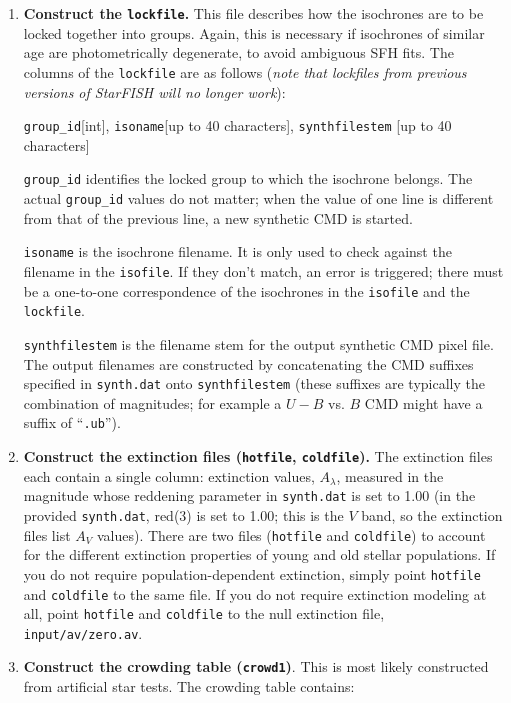 \documentclass[12pt]{book}
\def\ttg{\tt\color{DarkGreen}}
\def\tto{\tt\color{myOrange}}
\def\itr{\it\color{myRed}}
\begin{document}
\begin{enumerate}
\item {\bf Construct the {\tto lockfile}.}  This file describes how the 
isochrones are to be locked together into groups.  Again, this is 
necessary if isochrones of similar age are photometrically degenerate, 
to avoid ambiguous SFH fits.  The columns of the {\tto lockfile} are as 
follows ({\itr note that lockfiles from previous versions of StarFISH 
will no longer work}):

\medskip
\noindent
{\tto group\_id}[int], 
{\tto isoname}[up to 40 characters], 
{\tto synthfilestem} [up to 40 characters]

\medskip
{\tto group\_id} identifies the locked group to which the isochrone 
belongs.  The actual {\tto group\_id} values do not matter; when the 
value of one line is different from that of the previous line, a new 
synthetic CMD is started.

{\tto isoname} is the isochrone filename.  It is only used to 
check against the filename in the {\tto isofile}.  If they don't 
match, an error is triggered; there must be a one-to-one 
correspondence of the isochrones in the {\tto isofile} and the 
{\tto lockfile}.

{\tto synthfilestem} is the filename stem for the output synthetic 
CMD pixel file.  The output filenames are constructed by concatenating 
the CMD suffixes specified in {\ttg synth.dat} onto 
{\tto synthfilestem} (these suffixes are typically the combination of 
magnitudes; for example a $U-B$ vs. $B$ CMD might have a suffix of 
``{\ttg .ub}'').

\item {\bf Construct the extinction files ({\tto hotfile}, 
{\tto coldfile}).}  The extinction files each contain a single column: 
extinction values, $A_{\lambda}$, measured in the magnitude whose 
reddening parameter in {\ttg synth.dat} is set to 1.00 (in the 
provided {\ttg synth.dat}, red(3) is set to 1.00; this is the $V$ 
band, so the extinction files list $A_V$ values).  There are two files 
({\tto hotfile} and {\tto coldfile}) to account for the different 
extinction properties of young and old stellar populations.  If you do 
not require population-dependent extinction, simply point 
{\tto hotfile} and {\tto coldfile} to the same file.  If you do not 
require extinction modeling at all, point {\tto hotfile} and 
{\tto coldfile} to the null extinction file, {\ttg input/av/zero.av}.
   
\item {\bf Construct the crowding table ({\tto crowd1})}. This is most 
likely constructed from artificial star tests.  The crowding table 
contains:


\end{enumerate}
\end{document}

